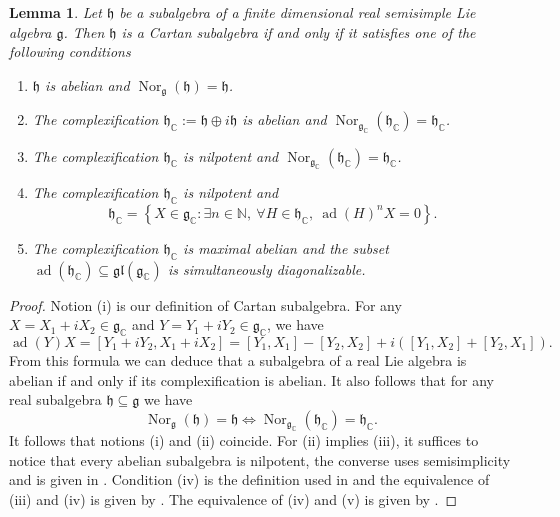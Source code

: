 \documentclass[12pt]{amsart}
\newcommand{\N}{\mathbb{N} }
\newcommand{\C}{\mathbb{C} }
\newcommand{\frakg}{\mathfrak{g}}
\newcommand{\frakh}{\mathfrak{h}}
\numberwithin{equation}{section}
\newtheorem{lemma}[theorem]{Lemma}
\theoremstyle{remark} %
\begin{document}
\begin{lemma}\label{lem:defs_Cartan_subalgebra}
	Let $\mathfrak{h}$ be a subalgebra of a finite dimensional real semisimple Lie algebra $\frakg$. Then $\frakh$ is a Cartan subalgebra if and only if it satisfies one of the following conditions
	\begin{enumerate}
		\item [(i)] $\frakh$ is abelian and $\operatorname{Nor}_\frakg (\frakh) = \frakh$.
		\item [(ii)] The complexification $\frakh_\C := \frakh \oplus i \frakh$ is abelian and $\operatorname{Nor}_{\frakg_\C} (\frakh_\C) = \frakh_\C$.
		\item [(iii)] The complexification $\frakh_\C $ is nilpotent and $\operatorname{Nor}_{\frakg_\C} (\frakh_\C) = \frakh_\C$.
		\item [(iv)] The complexification $\frakh_\C $ is nilpotent and 
		$$
		\frakh_\C = \left\{ X \in \frakg_\C \colon \exists n \in \N ,\ \forall H \in \frakh_\C ,\ \operatorname{ad}(H)^n X = 0  \right\}.
		$$
		\item [(v)] The complexification $\frakh_\C$ is maximal abelian and the subset $\operatorname{ad}(\frakh_\C) \subseteq \mathfrak{gl}(\frakg_\C)$ is simultaneously diagonalizable.
	\end{enumerate}
\end{lemma}
\begin{proof}
	Notion (i) is our definition of Cartan subalgebra. For any $X = X_1 + i X_2 \in \frakg_\C$ and $Y= Y_1+iY_2 \in \frakg_\C$, we have
	$$
	\operatorname{ad}(Y)X  = [Y_1+iY_2 , X_1 + iX_2] = [Y_1,X_1] - [Y_2,X_2] +i ([Y_1, X_2] + [Y_2,X_1]).
	$$  
	From this formula we can deduce that a subalgebra of a real Lie algebra is abelian if and only if its complexification is abelian. It also follows that for any real subalgebra $\frakh \subseteq \frakg$ we have
	$$
	\operatorname{Nor}_{\frakg}(\frakh) = \frakh \iff \operatorname{Nor}_{\frakg_\C}(\frakh_\C) = \frakh_\C. %
	$$
	It follows that notions (i) and (ii) coincide. For (ii) implies (iii), it suffices to notice that every abelian subalgebra is nilpotent, the converse uses semisimplicity and is given in \cite[Proposition 2.10]{Kna}. Condition (iv) is the definition used in \cite{Kna} and the equivalence of (iii) and (iv) is given by \cite[Proposition 2.7]{Kna}. The equivalence of (iv) and (v) is given by \cite[Corollary 2.13]{Kna}.
\end{proof}
\end{document}
